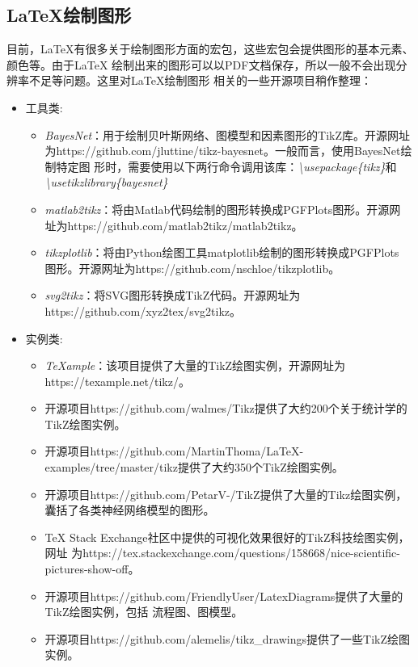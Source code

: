 \subsection{\LaTeX 绘制图形}
目前，LaTeX有很多关于绘制图形方面的宏包，这些宏包会提供图形的基本元素、颜色等。由于LaTeX
绘制出来的图形可以以PDF文档保存，所以一般不会出现分辨率不足等问题。这里对LaTeX绘制图形
相关的一些开源项目稍作整理：

\begin{itemize}
      \item 工具类:
            \begin{itemize}
                  \item \emph{BayesNet}：用于绘制贝叶斯网络、图模型和因素图形的TikZ库。开源网址
                        为https://github.com/jluttine/tikz-bayesnet。一般而言，使用BayesNet绘制特定图
                        形时，需要使用以下两行命令调用该库：\emph{\textbackslash usepackage\{tikz\}}和
                        \emph{\textbackslash usetikzlibrary\{bayesnet\}}
                  \item \emph{matlab2tikz}：将由Matlab代码绘制的图形转换成PGFPlots图形。开源网
                        址为https://github.com/matlab2tikz/matlab2tikz。
                  \item \emph{tikzplotlib}：将由Python绘图工具matplotlib绘制的图形转换成PGFPlots
                        图形。开源网址为https://github.com/nschloe/tikzplotlib。
                  \item \emph{svg2tikz}：将SVG图形转换成TikZ代码。开源网址为https://github.com/xyz2tex/svg2tikz。
            \end{itemize}
      \item 实例类:
            \begin{itemize}
                  \item \emph{TeXample}：该项目提供了大量的TikZ绘图实例，开源网址为https://texample.net/tikz/。
                  \item 开源项目https://github.com/walmes/Tikz提供了大约200个关于统计学的TikZ绘图实例。
                  \item 开源项目https://github.com/MartinThoma/LaTeX-examples/tree/master/tikz提供了大约350个TikZ绘图实例。
                  \item 开源项目https://github.com/PetarV-/TikZ提供了大量的Tikz绘图实例，囊括了各类神经网络模型的图形。
                  \item TeX Stack Exchange社区中提供的可视化效果很好的TikZ科技绘图实例，网址
                        为https://tex.stackexchange.com/questions/158668/nice-scientific-pictures-show-off。
                  \item 开源项目https://github.com/FriendlyUser/LatexDiagrams提供了大量的TikZ绘图实例，包括
                        流程图、图模型。
                  \item 开源项目https://github.com/alemelis/tikz\_drawings提供了一些TikZ绘图实例。
            \end{itemize}
\end{itemize}

